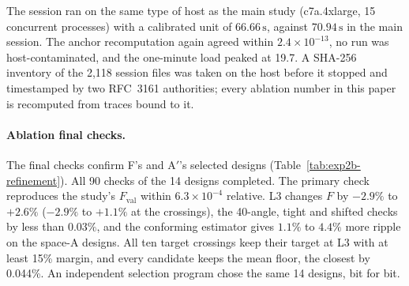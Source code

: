 \documentclass{anvil-paper}
\begin{document}
The session ran on the same type of host as the main study (c7a.4xlarge,
15 concurrent processes) with a calibrated unit of $66.66\,\mathrm{s}$,
against $70.94\,\mathrm{s}$ in the main session. The anchor recomputation
again agreed within $2.4\times10^{-13}$, no run was host-contaminated, and
the one-minute load peaked at 19.7. A SHA-256 inventory of the 2,118
session files was taken on the host before it stopped and timestamped by
two RFC~3161 authorities; every ablation number in this paper is
recomputed from traces bound to it.

\paragraph{Ablation final checks.}
The final checks confirm F's and A$'$'s selected designs
(Table~\ref{tab:exp2b-refinement}). All 90 checks of the 14 designs
completed. The primary check reproduces the study's $F_{\mathrm{val}}$
within $6.3\times10^{-4}$ relative. L3 changes $F$ by $-2.9\%$ to $+2.6\%$
($-2.9\%$ to $+1.1\%$ at the crossings), the 40-angle, tight and shifted
checks by less than $0.03\%$, and the conforming estimator gives $1.1\%$ to
$4.4\%$ more ripple on the space-A designs. All ten target crossings keep
their target at L3 with at least 15\% margin, and every candidate keeps the
mean floor, the closest by 0.044\%. An independent selection program chose
the same 14 designs, bit for bit.

\begin{table}[H]\centering\small
\caption{Post-hoc ablation (Section~\ref{sec:exp2-fd}): charged time units
to the first attaining validation for A$'$ and F, repeat~1, and their
ratio per start; the last column gives the geometric mean, with repeat~2 in
parentheses. Units are those of the ablation session.}
\label{tab:exp2b-ratios}
\end{table}

\begin{table}[H]\centering\small
\caption{Validation charges in the ablation, repeat~1. ``To crossing''
counts the validations up to and including the first attaining one;
``share'' is the fraction of the time to that target charged to validation,
as medians (ranges) over all attained targets and starts; ``run'' is the
range over starts of the fraction of the whole run's charged time spent in
validation.}
\label{tab:exp2b-validation}
\end{table}

\begin{table}[H]\centering\small
\caption{Final checks of the ablation's selected designs, as in
Table~\ref{tab:exp2-refinement}: L2 objective, L3 change, the largest
40-angle, tight or shifted change, and the conforming change where stator
offsets are zero.}
\label{tab:exp2b-refinement}
\end{table}
\end{document}
